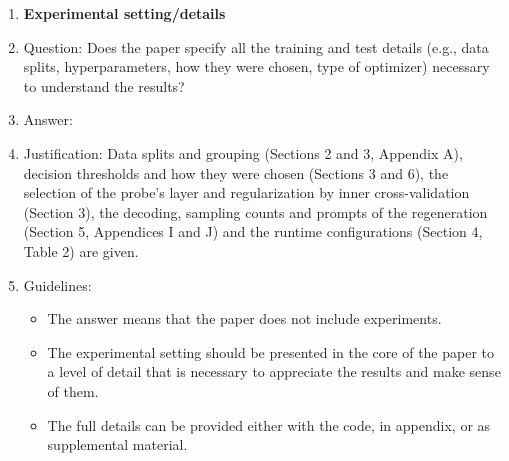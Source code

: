 \begin{enumerate}
\item {\bf Experimental setting/details}
    \item[] Question: Does the paper specify all the training and test details (e.g., data splits, hyperparameters, how they were chosen, type of optimizer) necessary to understand the results?
    \item[] Answer: \answerYes{}
    \item[] Justification: Data splits and grouping (Sections 2 and 3, Appendix A), decision thresholds and how they were chosen (Sections 3 and 6), the selection of the probe's layer and regularization by inner cross-validation (Section 3), the decoding, sampling counts and prompts of the regeneration (Section 5, Appendices I and J) and the runtime configurations (Section 4, Table 2) are given.
    \item[] Guidelines:
    \begin{itemize}
        \item The answer \answerNA{} means that the paper does not include experiments.
        \item The experimental setting should be presented in the core of the paper to a level of detail that is necessary to appreciate the results and make sense of them.
        \item The full details can be provided either with the code, in appendix, or as supplemental material.
    \end{itemize}


\end{enumerate}
